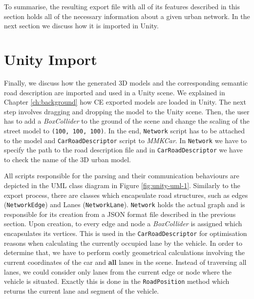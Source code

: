To summarise, the resulting export file with all of its features described in this section holds all of the necessary information about a given urban network. In the next section we discuss how it is imported in Unity.

\section{Unity Import}

Finally, we discuss how the generated 3D models and the corresponding semantic road description are imported and used in a Unity scene. We explained in Chapter \ref{ch:background} how CE exported models are loaded in Unity. The next step involves dragging and dropping the model to the Unity scene. Then, the user has to add a \emph{BoxCollider} to the ground of the scene and change the scaling of the street model to \texttt{(100, 100, 100)}. In the end, \texttt{Network} script has to be attached to the model and \texttt{CarRoadDescriptor} script to \emph{MMKCar}. In \texttt{Network} we have to specify the path to the road description file and in \texttt{CarRoadDescriptor} we have to check the name of the 3D urban model. 

All scripts responsible for the parsing and their communication behaviours are depicted in the UML class diagram in Figure \ref{fig:unity-uml-1}. Similarly to the export process, there are classes which encapsulate road structures, such as edges (\texttt{NetworkEdge}) and Lanes (\texttt{NetworkLane}). \texttt{Network} holds the actual graph and is responsible for its creation from a JSON format file described in the previous section. Upon creation, to every edge and node a \emph{BoxCollider} is assigned which encapsulates its vertices. This is used in the \texttt{CarRoadDescriptor} for optimisation reasons when calculating the currently occupied lane by the vehicle. In order to determine that, we have to perform costly geometrical calculations involving the current coordinates of the car and \textbf{all} lanes in the scene. Instead of traversing all lanes, we could consider only lanes from the current edge or node where the vehicle is situated. Exactly this is done in the \texttt{RoadPosition} method which returns the current lane and segment of the vehicle. \\

